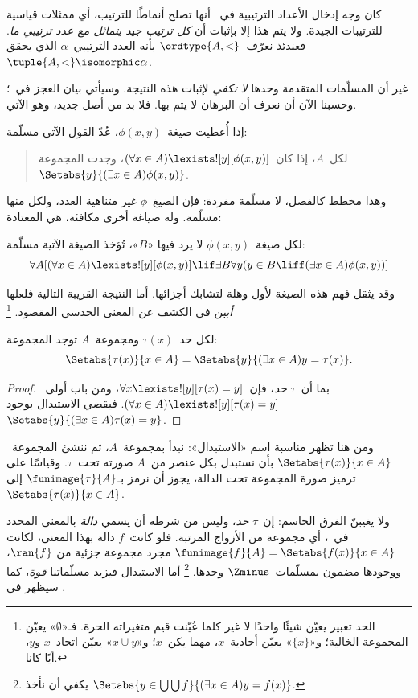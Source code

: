 \documentclass[../../../include/open-logic-section]{subfiles}
\begin{document}

كان وجه إدخال الأعداد الترتيبية في~
أنها تصلح أنماطًا للترتيب، أي ممثلات قياسية للترتيبات الجيدة. ولا يتم
هذا إلا بإثبات أن \emph{كل ترتيب جيد يتماثل مع عدد ترتيبي ما}.
فعندئذ نعرّف~$\ordtype{A, <}$ بأنه العدد الترتيبي~$\alpha$ الذي
يحقق~$\tuple{A, <} \isomorphic \alpha$.

غير أن المسلّمات المتقدمة وحدها \emph{لا تكفي} لإثبات هذه النتيجة.
وسيأتي بيان العجز في~؛ وحسبنا الآن
أن نعرف أن البرهان لا يتم بها. فلا بد من أصل جديد، وهو الآتي.

\begin{axiom}
إذا أُعطيت صيغة~$\phi(x, y)$، عُدّ القول الآتي مسلّمة:
\begin{quote}
لكل~$A$، إذا كان~$(\forall x \in A)\lexists![y][\phi(x,y)]$،
وجدت المجموعة~$\Setabs{y}{(\exists x \in A)\phi(x,y)}$.
\end{quote}
\end{axiom}
\noindent
وهذا مخطط كالفصل، لا مسلّمة مفردة: فإن الصيغ~$\phi$ غير متناهية
العدد، ولكل منها مسلّمة. وله صياغة أخرى مكافئة، هي المعتادة:

\begin{defish}
لكل صيغة~$\phi(x,y)$ لا يرد فيها «$B$»، تُؤخذ الصيغة الآتية مسلّمة:
\[
\forall A[(\forall x \in A)\lexists![y][\phi(x,y)] \lif
\exists B\forall y (y \in B \liff (\exists x \in A)\phi(x,y))]
\]
\end{defish}

وقد يثقل فهم هذه الصيغة لأول وهلة لتشابك أجزائها. أما النتيجة
القريبة التالية فلعلها \emph{أبين} في الكشف عن المعنى الحدسي المقصود.
\footnote{الحد تعبير يعيّن شيئًا واحدًا لا غير كلما عُيّنت قيم
متغيراته الحرة. فـ«$\emptyset$» يعيّن المجموعة الخالية؛ و«$\{x\}$»
يعيّن أحادية~$x$، مهما يكن~$x$؛ و«$x \cup y$» يعيّن اتحاد~$x$
و$y$، أيًا كانا.}

\begin{cor}
لكل حد~$\tau(x)$ ومجموعة~$A$ توجد المجموعة:
\[
\Setabs{\tau(x)}{x \in A} = \Setabs{y}{(\exists x \in A)y = \tau(x)}.
\]
\end{cor}

\begin{proof}
بما أن~$\tau$ \emph{حد}، فإن~$\forall x \lexists![y][\tau(x) = y]$،
ومن باب أولى~$(\forall x \in A)\lexists![y][\tau(x) = y]$.
فيقضي الاستبدال بوجود~$\Setabs{y}{(\exists x \in A)\tau(x) = y}$.
\end{proof}
\noindent
ومن هنا تظهر مناسبة اسم «الاستبدال»: نبدأ بمجموعة~$A$، ثم ننشئ
المجموعة~$\Setabs{\tau(x)}{x \in A}$ بأن نستبدل بكل عنصر من~$A$
صورته تحت~$\tau$. وقياسًا على ترميز صورة المجموعة تحت الدالة،
يجوز أن نرمز بـ$\funimage{\tau}{A}$ إلى~$\Setabs{\tau(x)}{x \in A}$.

ولا يغيبنّ الفرق الحاسم: إن~$\tau$ \emph{حد}، وليس من شرطه أن
يسمي \emph{دالة} بالمعنى المحدد في~،
أي مجموعة من الأزواج المرتبة. فلو كانت~$f$ دالة بهذا المعنى، لكانت
$\funimage{f}{A} = \Setabs{f(x)}{x \in A}$ مجرد مجموعة جزئية من
$\ran{f}$، ووجودها مضمون بمسلّمات~$\Zminus$ وحدها.
\footnote{يكفي أن نأخذ
$\Setabs{y \in \bigcup \bigcup f}{(\exists x \in A)y = f(x)}$.}
أما الاستبدال فيزيد مسلّماتنا \emph{قوة}، كما سيظهر في
.
\end{document}
